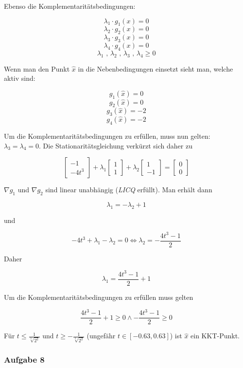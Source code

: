 \documentclass[a4paper, 12pt]{report}
\begin{document}
Ebenso die Komplementaritätsbedingungen:

$$\lambda_1\cdot g_1(x) = 0$$
$$\lambda_2\cdot g_2(x) = 0$$
$$\lambda_3\cdot g_3(x) = 0$$
$$\lambda_4\cdot g_4(x) = 0$$
$$\lambda_1 \text{ , } \lambda_2 \text{ , } \lambda_3 \text{ , } \lambda_4 \geq 0$$

Wenn man den Punkt $\hat{x}$ in die Nebenbedingungen einsetzt sieht man, welche aktiv sind:

$$g_1(\hat{x}) = 0$$
$$g_2(\hat{x}) = 0$$
$$g_3(\hat{x}) = -2$$
$$g_4(\hat{x}) = -2$$

Um die Komplementaritätsbedingungen zu erfüllen, muss nun gelten:\\
$\lambda_3 = \lambda_4 = 0$. Die Stationaritätsgleichung verkürzt sich daher zu

$$\begin{bmatrix}-1\\-4t^3\end{bmatrix} + \lambda_1 \begin{bmatrix}1\\1\end{bmatrix} + \lambda_2\begin{bmatrix}1\\-1\end{bmatrix} = \begin{bmatrix}0\\0\end{bmatrix}$$

$\nabla g_1$ und $\nabla g_2$ sind linear unabhängig (\textit{LICQ} erfüllt). Man erhält dann

$$\lambda_1 = -\lambda_2 + 1$$

und

$$-4t^3 + \lambda_1 - \lambda_2 = 0 \Leftrightarrow \lambda_2 = - \frac{4t^3 - 1}{2}$$

Daher

$$\lambda_1 = \frac{4t^3 - 1}{2} + 1$$

Um die Komplementaritätsbedingungen zu erfüllen muss gelten

$$\frac{4t^3 - 1}{2} + 1 \geq 0 \land - \frac{4t^3 - 1}{2} \geq 0$$

Für $t \leq \frac{1}{\sqrt[3]{2^2}}$ und $t \geq -\frac{1}{\sqrt[3]{2^2}}$ (ungefähr $t \in [-0.63, 0.63]$) ist $\hat{x}$ ein KKT-Punkt.

\subsubsection{Aufgabe 8}
\end{document}
